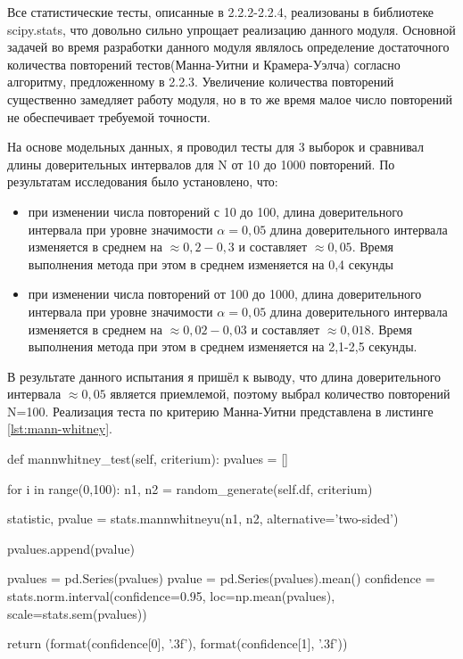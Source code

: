 Все статистические тесты, описанные в 2.2.2-2.2.4, реализованы в библиотеке scipy.stats, что довольно сильно упрощает реализацию данного модуля. Основной задачей во время разработки данного модуля являлось определение достаточного количества повторений тестов(Манна-Уитни и Крамера-Уэлча) согласно алгоритму, предложенному в 2.2.3. Увеличение количества повторений существенно замедляет работу модуля, но в то же время малое число повторений не обеспечивает требуемой точности. 

На основе модельных данных, я проводил тесты для 3 выборок и сравнивал длины доверительных интервалов для N от 10 до 1000 повторений. По результатам исследования было установлено, что:
\begin{itemize}
 \item при изменении числа повторений с 10 до 100, длина доверительного интервала при уровне значимости $\alpha = 0,05$ длина доверительного интервала изменяется в среднем на $\approx 0,2-0,3$ и составляет $\approx 0,05$. Время выполнения метода при этом в среднем изменяется на 0,4 секунды
 
 \item при изменении числа повторений от 100 до 1000, длина доверительного интервала при уровне значимости $\alpha = 0,05$ длина доверительного интервала изменяется в среднем на $\approx 0,02-0,03$ и составляет $\approx 0,018$. Время выполнения метода при этом в среднем изменяется на 2,1-2,5 секунды.
 
\end{itemize}

В результате данного испытания я пришёл к выводу, что длина доверительного интервала $\approx 0,05$ является приемлемой, поэтому выбрал количество повторений N=100. Реализация теста по критерию Манна-Уитни представлена в листинге \ref{lst:mann-whitney}.

\begin{flushleft}
	 \label{lst:mann-whitney}
	\begin{MyCodes}
def mannwhitney_test(self, criterium):
	pvalues = []
	
	for i in range(0,100):
		n1, n2 = random_generate(self.df, criterium)
		
		statistic, pvalue = stats.mannwhitneyu(n1, n2, alternative='two-sided')
		
		pvalues.append(pvalue)
	
	pvalues = pd.Series(pvalues)
	pvalue = pd.Series(pvalues).mean()
	confidence = stats.norm.interval(confidence=0.95, loc=np.mean(pvalues),
		scale=stats.sem(pvalues))
	
	return (format(confidence[0], '.3f'), format(confidence[1], '.3f'))
	
	\end{MyCodes}
\end{flushleft}


